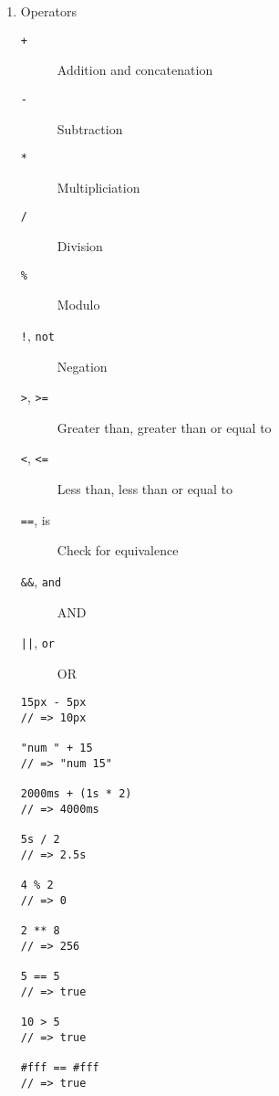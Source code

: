 \documentclass[10pt, twocolumn]{article}
\begin{document}
\begin{enumerate}

\item Operators
\begin{description}
\item[\texttt{+}] Addition and concatenation
\item[\texttt{-}] Subtraction
\item[\texttt{*}] Multipliciation
\item[\texttt{/}] Division
\item[\texttt{\%}] Modulo
\item[\texttt{!}, \texttt{not}] Negation
\item[\texttt{>}, \texttt{>=}] Greater than, greater than or equal to
\item[\texttt{<}, \texttt{<=}] Less than, less than or equal to
\item[\texttt{==}, is] Check for equivalence
\item[\texttt{&&}, \texttt{and}] AND
\item[\texttt{||}, \texttt{or}] OR
\end{description}
\begin{lstlisting}[frame=single]
15px - 5px
// => 10px

"num " + 15
// => "num 15"

2000ms + (1s * 2)
// => 4000ms

5s / 2
// => 2.5s

4 % 2
// => 0

2 ** 8
// => 256

5 == 5
// => true

10 > 5
// => true

#fff == #fff
// => true


\end{lstlisting}
\end{enumerate}
\end{document}
